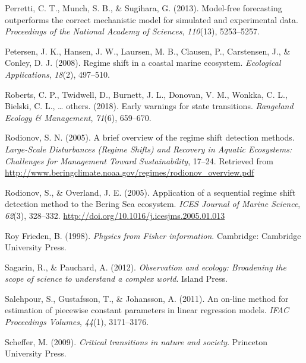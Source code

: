 \documentclass[12pt,twoside,openany]{reedthesis}
\begin{document}
\leavevmode\hypertarget{ref-perretti_model-free_2013}{}%
Perretti, C. T., Munch, S. B., \& Sugihara, G. (2013). Model-free forecasting outperforms the correct mechanistic model for simulated and experimental data. \emph{Proceedings of the National Academy of Sciences}, \emph{110}(13), 5253--5257.

\leavevmode\hypertarget{ref-petersen2008regime}{}%
Petersen, J. K., Hansen, J. W., Laursen, M. B., Clausen, P., Carstensen, J., \& Conley, D. J. (2008). Regime shift in a coastal marine ecosystem. \emph{Ecological Applications}, \emph{18}(2), 497--510.

\leavevmode\hypertarget{ref-roberts2018early}{}%
Roberts, C. P., Twidwell, D., Burnett, J. L., Donovan, V. M., Wonkka, C. L., Bielski, C. L., \ldots{} others. (2018). Early warnings for state transitions. \emph{Rangeland Ecology \& Management}, \emph{71}(6), 659--670.

\leavevmode\hypertarget{ref-rodionov_brief_2005}{}%
Rodionov, S. N. (2005). A brief overview of the regime shift detection methods. \emph{Large-Scale Disturbances (Regime Shifts) and Recovery in Aquatic Ecosystems: Challenges for Management Toward Sustainability}, 17--24. Retrieved from \url{http://www.beringclimate.noaa.gov/regimes/rodionov_overview.pdf}

\leavevmode\hypertarget{ref-rodionov_application_2005}{}%
Rodionov, S., \& Overland, J. E. (2005). Application of a sequential regime shift detection method to the Bering Sea ecosystem. \emph{ICES Journal of Marine Science}, \emph{62}(3), 328--332. \url{http://doi.org/10.1016/j.icesjms.2005.01.013}

\leavevmode\hypertarget{ref-frieden_physics_1998}{}%
Roy Frieden, B. (1998). \emph{Physics from Fisher information}. Cambridge: Cambridge University Press.

\leavevmode\hypertarget{ref-sagarin_observation_2012}{}%
Sagarin, R., \& Pauchard, A. (2012). \emph{Observation and ecology: Broadening the scope of science to understand a complex world}. Island Press.

\leavevmode\hypertarget{ref-salehpour2011line}{}%
Salehpour, S., Gustafsson, T., \& Johansson, A. (2011). An on-line method for estimation of piecewise constant parameters in linear regression models. \emph{IFAC Proceedings Volumes}, \emph{44}(1), 3171--3176.

\leavevmode\hypertarget{ref-scheffer_critical_2009}{}%
Scheffer, M. (2009). \emph{Critical transitions in nature and society}. Princeton University Press.
\end{document}
